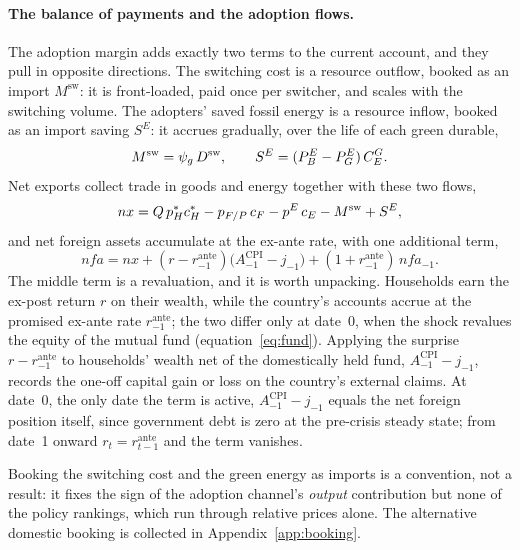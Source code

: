\paragraph{The balance of payments and the adoption flows.}
The adoption margin adds exactly two terms to the current account, and they pull
in opposite directions. The switching cost is a resource outflow, booked as an
import $M^{\mathrm{sw}}$: it is front-loaded, paid once per switcher, and scales with
the switching volume. The adopters' saved fossil energy is a resource inflow, booked
as an import saving $S^{E}$: it accrues gradually, over the life of each green
durable,
%
\begin{equation}
M^{\mathrm{sw}}=\psi_g\,D^{\mathrm{sw}},
\qquad
S^{E}=(P^{E}_{B}-P^{E}_{G})\,C^G_E.
\label{eq:adoption-flows}
\end{equation}
%
Net exports collect trade in goods and energy together with these two flows,
%
\begin{equation}
nx = Q\,p^{*}_H c^{*}_H - p_{F/P}\,c_F - p^{E}\,c_E
- M^{\mathrm{sw}} + S^{E},
\label{eq:nx}
\end{equation}
%
and net foreign assets accumulate at the ex-ante rate, with one additional term,
%
\begin{equation}
nfa = nx + (r-r^{\mathrm{ante}}_{-1})\bigl(A^{\mathrm{CPI}}_{-1}-j_{-1}\bigr)
+ (1+r^{\mathrm{ante}}_{-1})\,nfa_{-1}.
\label{eq:nfa}
\end{equation}
%
The middle term is a revaluation, and it is worth unpacking. Households earn the
ex-post return $r$ on their wealth, while the country's accounts accrue at the
promised ex-ante rate $r^{\mathrm{ante}}_{-1}$; the two differ only at date~0, when
the shock revalues the equity of the mutual fund (equation~\eqref{eq:fund}).
Applying the surprise $r-r^{\mathrm{ante}}_{-1}$ to households' wealth net of the
domestically held fund, $A^{\mathrm{CPI}}_{-1}-j_{-1}$, records the one-off capital
gain or loss on the country's external claims. At date~0, the only date the term is
active, $A^{\mathrm{CPI}}_{-1}-j_{-1}$ equals the net foreign position itself, since
government debt is zero at the pre-crisis steady state; from date~1 onward
$r_t=r^{\mathrm{ante}}_{t-1}$ and the term vanishes.

Booking the switching cost and the green energy as imports is a convention, not a
result: it fixes the sign of the adoption channel's \emph{output} contribution but
none of the policy rankings, which run through relative prices alone. The
alternative domestic booking is collected in Appendix~\ref{app:booking}.

